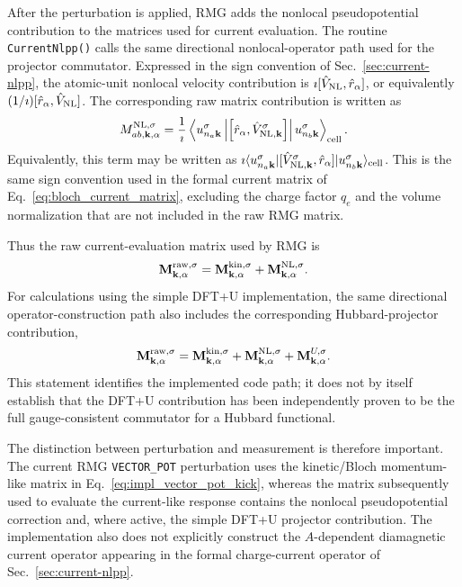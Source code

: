 After the perturbation is applied, RMG adds the nonlocal
pseudopotential contribution to the matrices used for current
evaluation.  The routine \texttt{CurrentNlpp()} calls the same
directional nonlocal-operator path used for the projector commutator.
Expressed in the sign convention of Sec.~\ref{sec:current-nlpp}, the
atomic-unit nonlocal velocity contribution is
$\imath[\hat V_{\rm NL},\hat r_\alpha]$, or equivalently
$(1/\imath)[\hat r_\alpha,\hat V_{\rm NL}]$.  The corresponding raw
matrix contribution is written as
\begin{equation}
  M_{ab,\mathbf k,\alpha}^{\rm NL,\sigma}
  =
  \frac{1}{\imath}
  \left\langle
    u_{n_a\mathbf k}^{\sigma}
    \left|
    \left[
      \hat r_\alpha,\hat V_{{\rm NL},\mathbf k}^{\sigma}
    \right]
    \right|
    u_{n_b\mathbf k}^{\sigma}
  \right\rangle_{\rm cell}.
  \label{eq:impl_mnl}
\end{equation}
Equivalently, this term may be written as
$\imath\langle u_{n_a\mathbf k}^{\sigma}|
[\hat V_{{\rm NL},\mathbf k}^{\sigma},\hat r_\alpha]
|u_{n_b\mathbf k}^{\sigma}\rangle_{\rm cell}$.
This is the same sign convention used in the formal current matrix of
Eq.~\eqref{eq:bloch_current_matrix}, excluding the charge factor
$q_e$ and the volume normalization that are not included in the raw
RMG matrix.

Thus the raw current-evaluation matrix used by RMG is
\begin{equation}
  \mathbf M_{\mathbf k,\alpha}^{\rm raw,\sigma}
  =
  \mathbf M_{\mathbf k,\alpha}^{\rm kin,\sigma}
  +
  \mathbf M_{\mathbf k,\alpha}^{\rm NL,\sigma}.
  \label{eq:impl_mraw}
\end{equation}
For calculations using the simple DFT+U implementation, the same
directional operator-construction path also includes the corresponding
Hubbard-projector contribution,
\begin{equation}
  \mathbf M_{\mathbf k,\alpha}^{\rm raw,\sigma}
  =
  \mathbf M_{\mathbf k,\alpha}^{\rm kin,\sigma}
  +
  \mathbf M_{\mathbf k,\alpha}^{\rm NL,\sigma}
  +
  \mathbf M_{\mathbf k,\alpha}^{U,\sigma}.
  \label{eq:impl_mraw_ldau}
\end{equation}
This statement identifies the implemented code path; it does not by
itself establish that the DFT+U contribution has been independently
proven to be the full gauge-consistent commutator for a Hubbard
functional.

The distinction between perturbation and measurement is therefore
important.  The current RMG \texttt{VECTOR\_POT} perturbation uses the
kinetic/Bloch momentum-like matrix in
Eq.~\eqref{eq:impl_vector_pot_kick}, whereas the matrix subsequently
used to evaluate the current-like response contains the nonlocal
pseudopotential correction and, where active, the simple DFT+U
projector contribution.  The implementation also does not explicitly
construct the $A$-dependent diamagnetic current operator appearing in
the formal charge-current operator of Sec.~\ref{sec:current-nlpp}.

